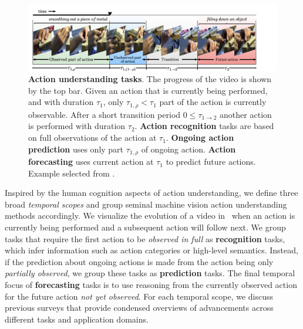 \documentclass[smallextended,twocolumn,natbib]{svjour3}
\begin{document}
\begin{figure}[t]
    \centering
    \includegraphics[width=\linewidth,trim={1cm 0 6cm 0},clip]{figs/action_understanding_tasks.pdf}
    \caption{\textbf{Action understanding tasks}. The progress of the video is shown by the top bar. Given an action that is currently being performed, and with duration $\tau_1$, only $\tau_{1,\rho}<\tau_1 $ part of the action is currently observable. After a short transition period $0\leq\tau_{1 \rightarrow 2}$ another action is performed with duration $\tau_2$. \textbf{Action recognition} tasks are based on full observations of the action at $\tau_1$. \textbf{Ongoing action prediction} uses only part $\tau_{1,\rho}$ of ongoing action. \textbf{Action forecasting} uses current action at $\tau_1$ to predict future actions. Example selected from \citep{wang2019vatex}.} 
    \label{fig:tasks}
\end{figure}

Inspired by the human cognition aspects of action understanding, we define three broad \emph{temporal scopes} and group seminal machine vision action understanding methods accordingly. We visualize the evolution of a video in~ when an action is currently being performed and a subsequent action will follow next. We group tasks that require the first action to be \emph{observed in full} as \textbf{recognition} tasks, which infer information such as action categories or high-level semantics. Instead, if the prediction about ongoing actions is made from the action being only \emph{partially observed}, we group these tasks as \textbf{prediction} tasks. The final temporal focus of \textbf{forecasting} tasks is to use reasoning from the currently observed action for the future action \emph{not yet observed}. For each temporal scope, we discuss previous surveys that provide condensed overviews of advancements across different tasks and application domains.
\end{document}
